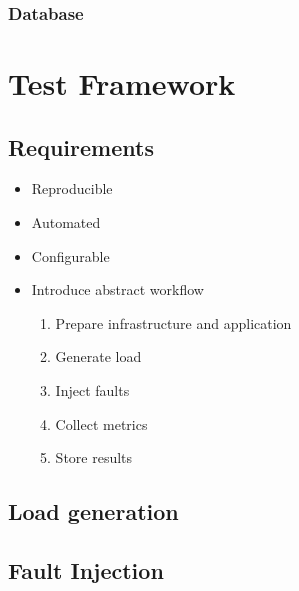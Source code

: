 \subsubsection{Database}


\section{Test Framework}


\subsection{Requirements}

\begin{itemize}
	\item Reproducible
	\item Automated
	\item Configurable
	\item Introduce abstract workflow \begin{enumerate}
		\item Prepare infrastructure and application
		\item Generate load
		\item Inject faults
		\item Collect metrics
		\item Store results
	\end{enumerate}
\end{itemize}


\subsection{Load generation}


\subsection{Fault Injection}


